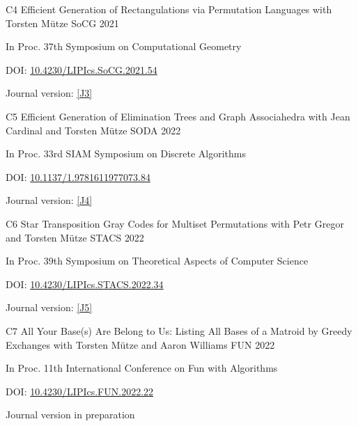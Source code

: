 \begin{cvpublication}
	{C4}
	{Efficient Generation of Rectangulations via Permutation Languages}
	{with Torsten Mütze}
	{SoCG}
	{2021}
    {
	\begin{cvitems}
	\item In Proc. 37th Symposium on Computational Geometry
	\item[] DOI: \href{https://doi.org/10.4230/LIPIcs.SoCG.2021.54}{10.4230/LIPIcs.SoCG.2021.54}
	\item Journal version: \hyperlink{paperC3}{[J3]}
	\end{cvitems}
	}
\end{cvpublication}
\begin{cvpublication}
	{C5}
	{Efficient Generation of Elimination Trees and Graph Associahedra}
	{with Jean Cardinal and Torsten Mütze}
	{SODA}
	{2022}
    {
	\begin{cvitems}
	\item In Proc. 33rd SIAM Symposium on Discrete Algorithms
	\item[] DOI: \href{https://doi.org/10.1137/1.9781611977073.84}{10.1137/1.9781611977073.84}
	\item Journal version: \hyperlink{paperC4}{[J4]}
	\end{cvitems}
	}
\end{cvpublication}
\begin{cvpublication}
	{C6}
	{Star Transposition Gray Codes for Multiset Permutations}
	{with Petr Gregor and Torsten Mütze}
	{STACS}
	{2022}
    {
	\begin{cvitems}
	\item In Proc. 39th Symposium on Theoretical Aspects of Computer Science
	\item[] DOI: \href{https://doi.org/10.4230/LIPIcs.STACS.2022.34}{10.4230/LIPIcs.STACS.2022.34}
	\item Journal version: \hyperlink{paperC5}{[J5]}
	\end{cvitems}
	}
\end{cvpublication}
\begin{cvpublication}
	{C7}
	{All Your Base(s) Are Belong to Us: Listing All Bases of a Matroid by Greedy Exchanges}
	{with Torsten Mütze and Aaron Williams}
	{FUN}
	{2022}
    {
	\begin{cvitems}
	\item In Proc. 11th International Conference on Fun with Algorithms
	\item[] DOI: \href{https://doi.org/10.4230/LIPIcs.FUN.2022.22}{10.4230/LIPIcs.FUN.2022.22}
	\item Journal version in preparation
	\end{cvitems}
	}
\end{cvpublication}
